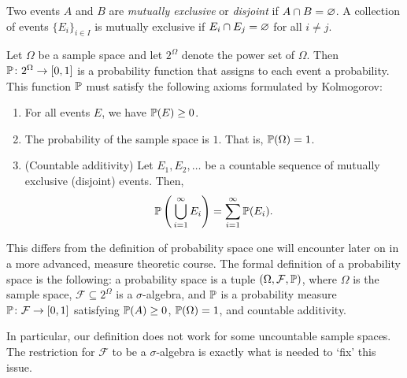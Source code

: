 \begin{definition}
  Two events $A$ and $B$ are \emph{mutually exclusive} or \emph{disjoint} if $A \cap B = \varnothing$. A collection of events $\{E_i\}_{i \in I}$ is mutually exclusive if $E_i \cap E_j = \varnothing$ for all $i \neq j$.
\end{definition}

\begin{definition}
  Let $\Omega$ be a sample space and let $2^{\Omega}$ denote the power set of $\Omega$. Then  $\operatorname{\mathbb{P}} \colon 2^{\Omega} \to [0, 1]$ is a probability function that assigns to each event a probability. This function $\operatorname{\mathbb{P}}$ must satisfy the following axioms formulated by Kolmogorov:
  \begin{enumerate}
    \item For all events $E$, we have $\operatorname{\mathbb{P}}(E) \ge 0$.
    \item The probability of the sample space is $1$. That is, $\operatorname{\mathbb{P}}(\Omega) = 1$.
    \item (Countable additivity) Let $E_1, E_2, \dots$ be a countable sequence of mutually exclusive (disjoint) events. Then, \[
    \operatorname{\mathbb{P}}\left(\, \bigcup_{i = 1}^{\infty} E_i \right) = \sum_{i = 1}^{\infty} \operatorname{\mathbb{P}}(E_i).
    \] 
  \end{enumerate}
\end{definition}

\begin{remark}
  This differs from the definition of probability space one will encounter later on in a more advanced, measure theoretic course. The formal definition of a probability space is the following: a probability space is a tuple $(\Omega, \mathcal{F}, \operatorname{\mathbb{P}})$, where $\Omega$ is the sample space, $\mathcal{F} \subseteq 2^{\Omega}$ is a $\sigma$-algebra, and $\operatorname{\mathbb{P}}$ is a probability measure $\operatorname{\mathbb{P}} \colon \mathcal{F} \to [0, 1]$ satisfying $\operatorname{\mathbb{P}}(A) \ge 0$, $\operatorname{\mathbb{P}}(\Omega) = 1$, and countable additivity.

  In particular, our definition does not work for some uncountable sample spaces. The restriction for $\mathcal{F}$ to be a $\sigma$-algebra is exactly what is needed to `fix' this issue.
\end{remark}

